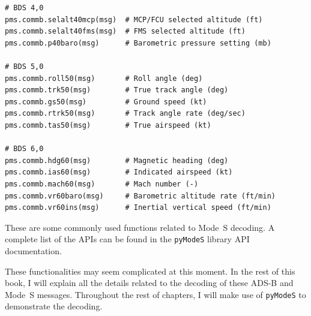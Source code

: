 \begin{verbatim}
# BDS 4,0
pms.commb.selalt40mcp(msg)  # MCP/FCU selected altitude (ft)
pms.commb.selalt40fms(msg)  # FMS selected altitude (ft)
pms.commb.p40baro(msg)      # Barometric pressure setting (mb)

# BDS 5,0
pms.commb.roll50(msg)       # Roll angle (deg)
pms.commb.trk50(msg)        # True track angle (deg)
pms.commb.gs50(msg)         # Ground speed (kt)
pms.commb.rtrk50(msg)       # Track angle rate (deg/sec)
pms.commb.tas50(msg)        # True airspeed (kt)

# BDS 6,0
pms.commb.hdg60(msg)        # Magnetic heading (deg)
pms.commb.ias60(msg)        # Indicated airspeed (kt)
pms.commb.mach60(msg)       # Mach number (-)
pms.commb.vr60baro(msg)     # Barometric altitude rate (ft/min)
pms.commb.vr60ins(msg)      # Inertial vertical speed (ft/min)
\end{verbatim}

These are some commonly used functions related to Mode~S decoding. A complete list of the APIs can be found in the \texttt{pyModeS} library API documentation. 

These functionalities may seem complicated at this moment. In the rest of this book, I will explain all the details related to the decoding of these ADS-B and Mode~S messages. Throughout the rest of chapters, I will make use of \texttt{pyModeS} to demonstrate the decoding.
